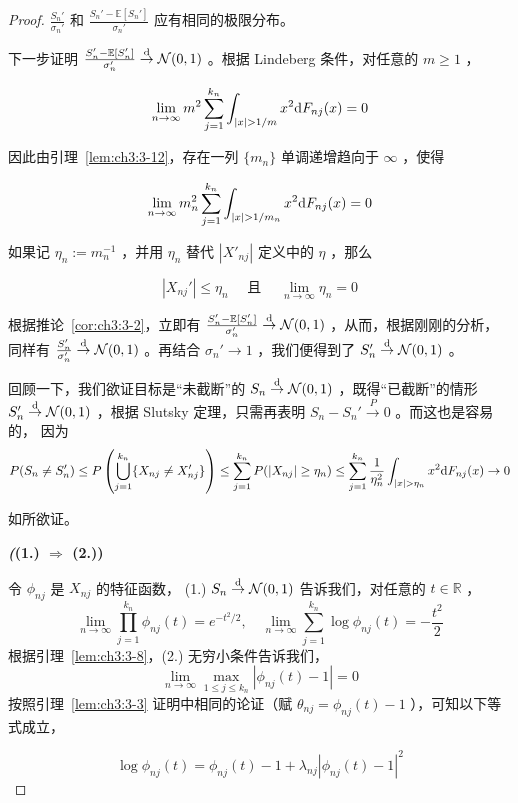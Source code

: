 \begin{proof}
$\frac{S_n'}{\sigma_n'}$ 和 $\frac{S_n'-\mathbb{E}[S_n']}{\sigma_n'}$ 应有相同的极限分布。

下一步证明 $\frac{S_n' - \mathbb{E}[S_n']}{\sigma_n'} \overset{\rm d}\to \mathcal{N}(0, 1)$ 。根据 Lindeberg 条件，对任意的 $m\ge 1$ ，

$$\lim_{n\to\infty}m^2\sum_{j=1}^{k_n}\int_{|x|>1/m}x^2{\rm d}F_{nj}(x)=0$$

因此由引理~\ref{lem:ch3:3-12}，存在一列 $\{m_n\}$ 单调递增趋向于 $\infty$ ，使得 

$$\lim_{n\to\infty}m_n^2\sum_{j=1}^{k_n}\int_{|x|>1/m_n}x^2{\rm d}F_{nj}(x)=0$$

如果记 $\eta_n:=m_n^{-1}$ ，并用 $\eta_n$ 替代 $|X'_{nj}|$ 定义中的 $\eta$ ，那么

$$|X_{nj}'|\le \eta_n\quad \text{ 且 }\quad \lim_{n\to\infty}\eta_n=0$$

根据推论~\ref{cor:ch3:3-2}，立即有 $\frac{S_n'-\mathbb{E}[S_n']}{\sigma'_n}\overset{\rm d}\to\mathcal N(0,1)$ ，从而，根据刚刚的分析， 同样有 $\frac{S_n'}{\sigma'_n}\overset{\rm d}\to \mathcal{N}(0,1)$ 。再结合 $\sigma_n'\to 1$ ，我们便得到了 $S_n'\overset{\rm d}\to \mathcal N(0,1)$ 。

回顾一下，我们欲证目标是``未截断''的 $S_n\overset{\rm d}\to \mathcal N(0,1)$ ，既得``已截断''的情形 $S_n'\overset{\rm d}\to \mathcal N(0,1)$ ，根据 Slutsky 定理，只需再表明 $S_n-S_n'\overset{P}\to 0$ 。而这也是容易的， 因为
\[ P(S_n\neq S_n')\leq P\left(\bigcup_{j = 1}^{k_n}\{X_{nj}\neq X_{nj}'\}\right)\leq \sum_{j = 1}^{k_n}P(|X_{nj}|\geq \eta_n) \leq \sum_{j = 1}^{k_n}\frac{1}{\eta_n^2}\int_{|x| > \eta_n}x^2 {\rm d}F_{nj}(x) \to 0 \]

如所欲证。

\textbf{\emph((1.) $\Rightarrow$ (2.))}

令 $\phi_{nj}$ 是 $X_{nj}$ 的特征函数， (1.) $S_{n} \overset{\rm d}\to \mathcal N(0,1)$ 告诉我们，对任意的 $t\in\mathbb R$ ，
\[\lim_{n\to \infty}\prod_{j = 1}^{k_n}\phi_{nj}(t) = e^{-t^2 / 2},\quad \lim_{n\to \infty}\sum_{j = 1}^{k_n}\log \phi_{nj}(t) = -\frac{t^2}{2}\]
根据引理~\ref{lem:ch3:3-8}，(2.) 无穷小条件告诉我们，
\[\lim_{n\to \infty} \max_{1\leq j\leq k_n}|\phi_{nj}(t) - 1| = 0\]
按照引理~\ref{lem:ch3:3-3} 证明中相同的论证（赋 $\theta_{nj} = \phi_{nj}(t) - 1$ ），可知以下等式成立，

\begin{equation}
\label{eq:ch3:tag-9}
\log \phi_{nj}(t)  = \phi_{nj}(t) - 1 + \lambda_{nj}|\phi_{nj}(t) - 1|^{2}
\end{equation}


\end{proof}
